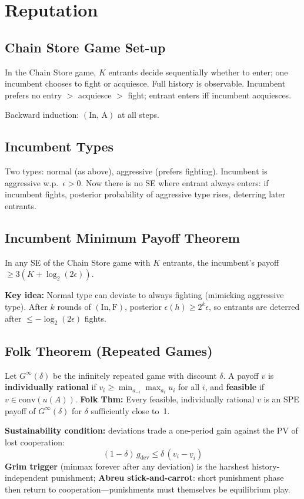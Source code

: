\section{Reputation}
\subsection{Chain Store Game Set-up}
In the Chain Store game, \(K\) entrants decide sequentially whether to enter; one incumbent chooses to fight or acquiesce. Full history is observable. Incumbent prefers no entry $>$ acquiesce $>$ fight; entrant enters iff incumbent acquiesces.

Backward induction: $(\mathrm{In},\,\mathrm{A})$ at all steps.

\subsection{Incumbent Types}
Two types: normal (as above), aggressive (prefers fighting). Incumbent is aggressive w.p.\ $\epsilon > 0$. Now there is no SE where entrant always enters: if incumbent fights, posterior probability of aggressive type rises, deterring later entrants.

\subsection{Incumbent Minimum Payoff Theorem}
In any SE of the Chain Store game with $K$ entrants, the incumbent's payoff $\geq 3(K + \log_2(2\epsilon))$.

\textbf{Key idea:} Normal type can deviate to always fighting (mimicking aggressive type). After $k$ rounds of $(\mathrm{In}, \mathrm{F})$, posterior $\epsilon(h) \geq 2^k \epsilon$, so entrants are deterred after $\leq -\log_2(2\epsilon)$ fights.

\subsection{Folk Theorem (Repeated Games)}
Let \(G^\infty(\delta)\) be the infinitely repeated game with discount \(\delta\). A payoff \(v\) is \textbf{individually rational} if \(v_i \geq \min_{a_{-i}}\max_{a_i} u_i\) for all \(i\), and \textbf{feasible} if \(v \in \mathrm{conv}(u(A))\). \textbf{Folk Thm:} Every feasible, individually rational \(v\) is an SPE payoff of \(G^\infty(\delta)\) for \(\delta\) sufficiently close to~1.

\textbf{Sustainability condition:} deviations trade a one-period gain against the PV of lost cooperation:
\[(1-\delta)\,g_{\text{dev}} \leq \delta\,(v_i - \underline{v}_i)\]
\textbf{Grim trigger} (minmax forever after any deviation) is the harshest history-independent punishment; \textbf{Abreu stick-and-carrot}: short punishment phase then return to cooperation---punishments must themselves be equilibrium play.

